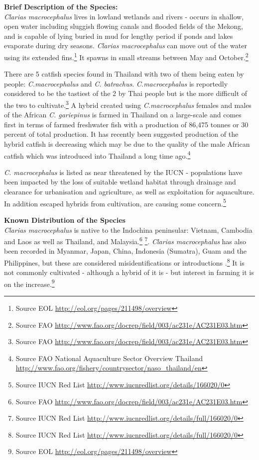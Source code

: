 \documentclass[]{book}
\theoremstyle{definition}
\theoremstyle{definition}
\theoremstyle{definition}
\theoremstyle{remark}
\begin{document}
\textbf{Brief Description of the Species:}\\
\emph{Clarias macrocephalus} lives in lowland wetlands and rivers -
occurs in shallow, open water including sluggish flowing canals and
flooded fields of the Mekong, and is capable of lying buried in mud for
lengthy period if ponds and lakes evaporate during dry seasons.
\emph{Clarias macrocephalus} can move out of the water using its
extended fins.\footnote{Source EOL
  \url{http://eol.org/pages/211498/overview}} It spawns in small streams
between May and October.\footnote{Source FAO
  \url{http://www.fao.org/docrep/field/003/ac231e/AC231E03.htm}}

There are 5 catfish species found in Thailand with two of them being
eaten by people: \emph{C.macrocephalus} and \emph{C. batrachus}.
\emph{C.macrocephalus} is reportedly considered to be the tastiest of
the 2 by Thai people but is the more difficult of the two to
cultivate.\footnote{Source FAO
  \url{http://www.fao.org/docrep/field/003/ac231e/AC231E03.htm}} A
hybrid created using \emph{C.macrocephalus} females and males of the
African \emph{C. gariepinus} is farmed in Thailand on a large-scale and
comes first in terms of farmed freshwater fish with a production of
86,475 tonnes or 30 percent of total production. It has recently been
suggested production of the hybrid catfish is decreasing which may be
due to the quality of the male African catfish which was introduced into
Thailand a long time ago.\footnote{Source FAO National Aquaculture
  Sector Overview Thailand
  \url{http://www.fao.org/fishery/countrysector/naso_thailand/en}}

\emph{C. macrocephalus} is listed as near threatened by the IUCN -
populations have been impacted by the loss of suitable wetland habitat
through drainage and clearance for urbanisation and agriculture, as well
as exploitation for aquaculture. In addition escaped hybrids from
cultivation, are causing some concern.\footnote{Source IUCN Red List
  \url{http://www.iucnredlist.org/details/166020/0}}

\textbf{Known Distribution of the Species}\\
\emph{Clarias macrocephalus} is native to the Indochina peninsular:
Vietnam, Cambodia and Laos as well as Thailand, and Malaysia.\footnote{Source
  FAO \url{http://www.fao.org/docrep/field/003/ac231e/AC231E03.htm}}
\footnote{Source IUCN Red List
  \url{http://www.iucnredlist.org/details/full/166020/0}}. \emph{Clarias
macrocephalus} has also been recorded in Myanmar, Japan, China,
Indonesia (Sumatra), Guam and the Philippines, but these are considered
misidentifications or introductions .\footnote{Source IUCN Red List
  \url{http://www.iucnredlist.org/details/full/166020/0}} It is not
commonly cultivated - although a hybrid of it is - but interest in
farming it is on the increase.\footnote{Source EOL
  \url{http://eol.org/pages/211498/overview}}
\end{document}
